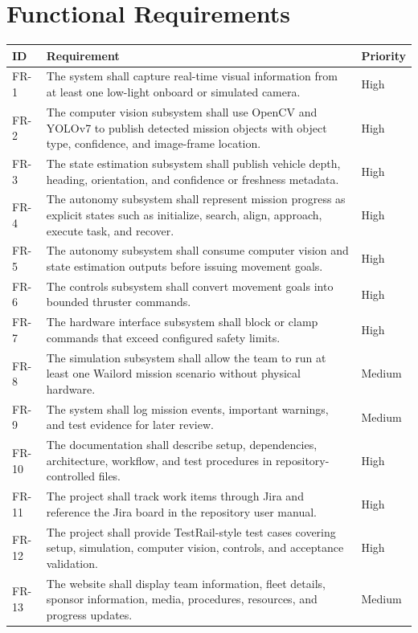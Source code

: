 \documentclass[12pt]{article}
\begin{document}
\section{Functional Requirements}
\begin{longtable}{|p{}|p{}|p{}|}
\hline
\textbf{ID} & \textbf{Requirement} & \textbf{Priority} \\
\hline
FR-1 & The system shall capture real-time visual information from at least one low-light onboard or simulated camera. & High \\
\hline
FR-2 & The computer vision subsystem shall use OpenCV and YOLOv7 to publish detected mission objects with object type, confidence, and image-frame location. & High \\
\hline
FR-3 & The state estimation subsystem shall publish vehicle depth, heading, orientation, and confidence or freshness metadata. & High \\
\hline
FR-4 & The autonomy subsystem shall represent mission progress as explicit states such as initialize, search, align, approach, execute task, and recover. & High \\
\hline
FR-5 & The autonomy subsystem shall consume computer vision and state estimation outputs before issuing movement goals. & High \\
\hline
FR-6 & The controls subsystem shall convert movement goals into bounded thruster commands. & High \\
\hline
FR-7 & The hardware interface subsystem shall block or clamp commands that exceed configured safety limits. & High \\
\hline
FR-8 & The simulation subsystem shall allow the team to run at least one Wailord mission scenario without physical hardware. & Medium \\
\hline
FR-9 & The system shall log mission events, important warnings, and test evidence for later review. & Medium \\
\hline
FR-10 & The documentation shall describe setup, dependencies, architecture, workflow, and test procedures in repository-controlled files. & High \\
\hline
FR-11 & The project shall track work items through Jira and reference the Jira board in the repository user manual. & High \\
\hline
FR-12 & The project shall provide TestRail-style test cases covering setup, simulation, computer vision, controls, and acceptance validation. & High \\
\hline
FR-13 & The website shall display team information, fleet details, sponsor information, media, procedures, resources, and progress updates. & Medium \\
\hline
\end{longtable}
\end{document}
